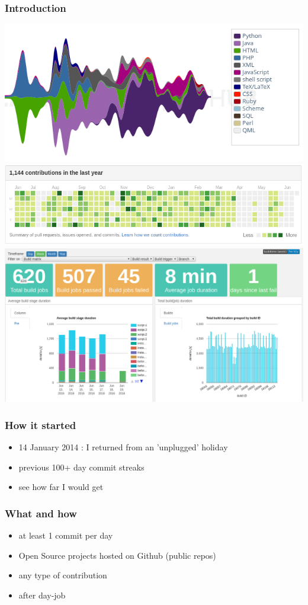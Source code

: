 \documentclass[14pt]{beamer}
\begin{document}
  \begin{frame}
    \frametitle{Introduction}
    \includegraphics[scale=.3]{openhub.png}
    \includegraphics[scale=.3]{github_19jun2016.png}\\
    \includegraphics[scale=.3]{screenshot_buildtimetrend.png}
  \end{frame}
  \begin{frame}
    \frametitle{How it started}
    \begin{itemize}
      \item 14 January 2014 : I returned from an 'unplugged' holiday
      \item previous 100+ day commit streaks
      \item see how far I would get
    \end{itemize}
  \end{frame}
  \begin{frame}
    \frametitle{What and how}
    \begin{itemize}
      \item at least 1 commit per day
      \item Open Source projects hosted on Github (public repos)
      \item any type of contribution
      \item after day-job
    \end{itemize}
  \end{frame}
\end{document}
